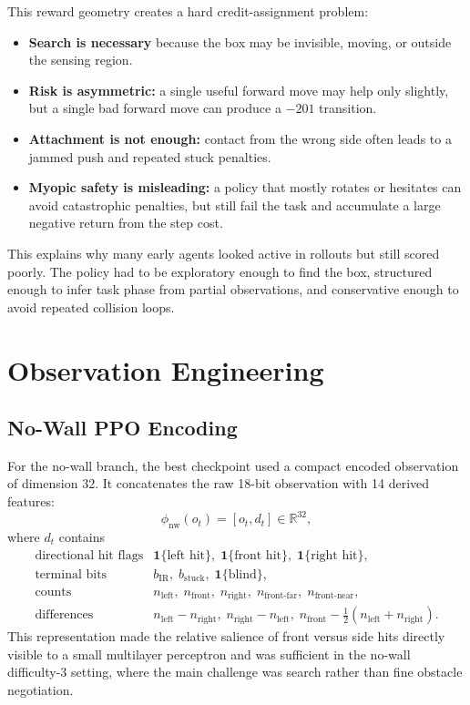 \documentclass[11pt]{article}
\begin{document}
This reward geometry creates a hard credit-assignment problem:
\begin{itemize}[leftmargin=1.5em]
  \item \textbf{Search is necessary} because the box may be invisible, moving, or outside
  the sensing region.
  \item \textbf{Risk is asymmetric:} a single useful forward move may help only slightly,
  but a single bad forward move can produce a \(-201\) transition.
  \item \textbf{Attachment is not enough:} contact from the wrong side often leads to a
  jammed push and repeated stuck penalties.
  \item \textbf{Myopic safety is misleading:} a policy that mostly rotates or hesitates can
  avoid catastrophic penalties, but still fail the task and accumulate a large negative
  return from the step cost.
\end{itemize}

This explains why many early agents looked active in rollouts but still scored poorly.
The policy had to be exploratory enough to find the box, structured enough to infer task
phase from partial observations, and conservative enough to avoid repeated collision
loops.

\section{Observation Engineering}

\subsection{No-Wall PPO Encoding}

For the no-wall branch, the best checkpoint used a compact encoded observation of
dimension 32. It concatenates the raw 18-bit observation with 14 derived features:
\[
  \phi_{\text{nw}}(o_t)=[o_t,d_t]\in\mathbb{R}^{32},
\]
where \(d_t\) contains
\[
\begin{array}{ll}
\text{directional hit flags} & \mathbf{1}\{\text{left hit}\},\; \mathbf{1}\{\text{front hit}\},\; \mathbf{1}\{\text{right hit}\},\\
\text{terminal bits} & b_{\text{IR}},\; b_{\text{stuck}},\; \mathbf{1}\{\text{blind}\},\\
\text{counts} & n_{\text{left}},\; n_{\text{front}},\; n_{\text{right}},\; n_{\text{front-far}},\; n_{\text{front-near}},\\
\text{differences} & n_{\text{left}}-n_{\text{right}},\; n_{\text{right}}-n_{\text{left}},\;
  n_{\text{front}}-\frac{1}{2}(n_{\text{left}}+n_{\text{right}}).
\end{array}
\]
This representation made the relative salience of front versus side hits directly visible
to a small multilayer perceptron and was sufficient in the no-wall difficulty-3 setting,
where the main challenge was search rather than fine obstacle negotiation.
\end{document}
